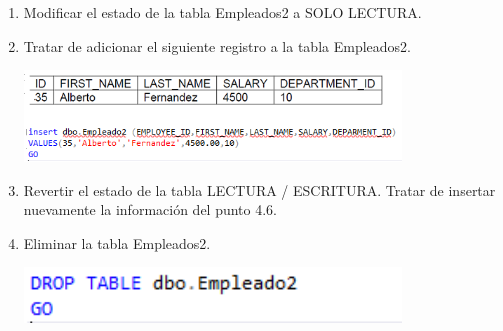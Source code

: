 \begin{enumerate}[1.]
	\item Modificar el estado de la tabla Empleados2 a SOLO LECTURA.
	\\
	
	\item Tratar de adicionar el siguiente registro a la tabla Empleados2.
	\\
	\begin{center}
	\includegraphics[width=10cm]{./Imagenes/eje6} 
	\end{center}

	
	\item Revertir el estado de la tabla LECTURA / ESCRITURA. Tratar de insertar nuevamente la información del punto 4.6.
	
	\item Eliminar la tabla Empleados2.
	\\
	\begin{center}
	\includegraphics[width=10cm]{./Imagenes/eje8} 
	\end{center}
	
\end{enumerate}